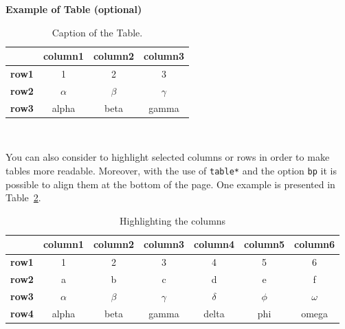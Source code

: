 \documentclass[11pt,a4paper]{article}
\begin{document}
\begin{table}[H]
    \caption*{\textbf{Example of Table (optional)}}
    \centering
    \begin{tabular}{|p{3em} c c c |}
        \hline
        \rowcolor{bluePoli!40}
                      & \textbf{column1} & \textbf{column2} & \textbf{column3} \T\B \\
        \hline \hline
        \textbf{row1} & 1                & 2                & 3 \T\B                \\
        \textbf{row2} & $\alpha$         & $\beta$          & $\gamma$ \T\B         \\
        \textbf{row3} & alpha            & beta             & gamma \B              \\
        \hline
    \end{tabular}
    \\[10pt]
    \caption{Caption of the Table.}
    \label{table:example}
\end{table}

You can also consider to highlight selected columns or rows in order to make tables more readable.
Moreover, with the use of \texttt{table*} and the option \texttt{bp} it is possible to align them at the bottom of the page. One example is presented in Table~\ref{table:exampleC}.

\begin{table}[bp]
    \centering
    \begin{tabular}{|p{3em} | c | c | c | c | c | c|}
        \hline
                      & \textbf{column1} & \textbf{column2} & \textbf{column3} & \textbf{column4} & \textbf{column5} & \textbf{column6} \T\B \\
        \hline \hline
        \textbf{row1} & 1                & 2                & 3                & 4                & 5                & 6 \T\B                \\
        \textbf{row2} & a                & b                & c                & d                & e                & f \T\B                \\
        \textbf{row3} & $\alpha$         & $\beta$          & $\gamma$         & $\delta$         & $\phi$           & $\omega$ \T\B         \\
        \textbf{row4} & alpha            & beta             & gamma            & delta            & phi              & omega \B              \\
        \hline
    \end{tabular}
    \\[10pt]
    \caption{Highlighting the columns}
    \label{table:exampleC}
\end{table}
\end{document}

